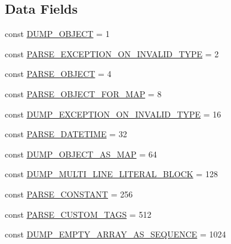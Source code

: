 \subsection*{Data Fields}
\begin{DoxyCompactItemize}
\item 
const \mbox{\hyperlink{class_symfony_1_1_component_1_1_yaml_1_1_yaml_ab1817385e64dcec99e30b879124be30f}{D\+U\+M\+P\+\_\+\+O\+B\+J\+E\+CT}} = 1
\item 
const \mbox{\hyperlink{class_symfony_1_1_component_1_1_yaml_1_1_yaml_a5a189ef40a1572df617e7eed2d55a51a}{P\+A\+R\+S\+E\+\_\+\+E\+X\+C\+E\+P\+T\+I\+O\+N\+\_\+\+O\+N\+\_\+\+I\+N\+V\+A\+L\+I\+D\+\_\+\+T\+Y\+PE}} = 2
\item 
const \mbox{\hyperlink{class_symfony_1_1_component_1_1_yaml_1_1_yaml_a2b9e74f4d07da6a803de1c48c6df6e01}{P\+A\+R\+S\+E\+\_\+\+O\+B\+J\+E\+CT}} = 4
\item 
const \mbox{\hyperlink{class_symfony_1_1_component_1_1_yaml_1_1_yaml_a570a6d9877bcb0c9eaffeb0f046e04b0}{P\+A\+R\+S\+E\+\_\+\+O\+B\+J\+E\+C\+T\+\_\+\+F\+O\+R\+\_\+\+M\+AP}} = 8
\item 
const \mbox{\hyperlink{class_symfony_1_1_component_1_1_yaml_1_1_yaml_aa6ae46d15e364f0c0b9d394bbe24821e}{D\+U\+M\+P\+\_\+\+E\+X\+C\+E\+P\+T\+I\+O\+N\+\_\+\+O\+N\+\_\+\+I\+N\+V\+A\+L\+I\+D\+\_\+\+T\+Y\+PE}} = 16
\item 
const \mbox{\hyperlink{class_symfony_1_1_component_1_1_yaml_1_1_yaml_ad08ffe7d5e5300cd050b804ccb4c4547}{P\+A\+R\+S\+E\+\_\+\+D\+A\+T\+E\+T\+I\+ME}} = 32
\item 
const \mbox{\hyperlink{class_symfony_1_1_component_1_1_yaml_1_1_yaml_adfad364cd9134aaa2c794f8e642f823b}{D\+U\+M\+P\+\_\+\+O\+B\+J\+E\+C\+T\+\_\+\+A\+S\+\_\+\+M\+AP}} = 64
\item 
const \mbox{\hyperlink{class_symfony_1_1_component_1_1_yaml_1_1_yaml_a403ab30a581f745104360191e3520766}{D\+U\+M\+P\+\_\+\+M\+U\+L\+T\+I\+\_\+\+L\+I\+N\+E\+\_\+\+L\+I\+T\+E\+R\+A\+L\+\_\+\+B\+L\+O\+CK}} = 128
\item 
const \mbox{\hyperlink{class_symfony_1_1_component_1_1_yaml_1_1_yaml_a7049ef83faca09605803d4d27a3a7cbf}{P\+A\+R\+S\+E\+\_\+\+C\+O\+N\+S\+T\+A\+NT}} = 256
\item 
const \mbox{\hyperlink{class_symfony_1_1_component_1_1_yaml_1_1_yaml_ae27e0cfe901cb897a10fc6738c63eb55}{P\+A\+R\+S\+E\+\_\+\+C\+U\+S\+T\+O\+M\+\_\+\+T\+A\+GS}} = 512
\item 
const \mbox{\hyperlink{class_symfony_1_1_component_1_1_yaml_1_1_yaml_a9218c80f067ac9728ecca223e5afbf18}{D\+U\+M\+P\+\_\+\+E\+M\+P\+T\+Y\+\_\+\+A\+R\+R\+A\+Y\+\_\+\+A\+S\+\_\+\+S\+E\+Q\+U\+E\+N\+CE}} = 1024
\end{DoxyCompactItemize}


